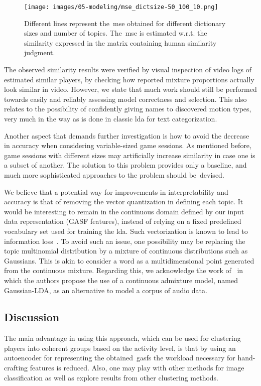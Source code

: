 \begin{figure}[h]
	\centering
	\texttt{[image: images/05-modeling/mse\_dictsize-50\_100\_10.png]}
	\caption{Different lines represent the~\gls{mse} obtained for different dictionary sizes and number of topics. The~\gls{mse} is estimated w.r.t. the similarity expressed in the matrix containing human similarity judgment.}
  \label{hyperparameter_results}
\end{figure}

The observed similarity results were verified by visual inspection of video logs of estimated similar players, by checking how reported mixture proportions actually look similar in video. However, we state that much work should still be performed towards easily and reliably assessing model correctness and selection. This also relates to the possibility of confidently giving names to discovered motion types, very much in the way as is done in classic \gls{lda} for text categorization.

Another aspect that demands further investigation is how to avoid the decrease in accuracy when considering variable-sized game sessions. As mentioned before, game sessions with different sizes may artificially increase similarity in case one is a subset of another. The solution to this problem provides only a baseline, and much more sophisticated approaches to the problem should be~devised.

We believe that a potential way for improvements in interpretability and accuracy is that of removing the vector quantization in defining each topic. It would be interesting to remain in the continuous domain defined by our input data representation (GASF features), instead of relying on a fixed predefined vocabulary set used for training the \gls{lda}. Such vectorization is known to lead to information loss~\cite{hu_latent_2012}. To avoid such an issue, one possibility may be replacing the topic multinomial distribution by a mixture of continuous distributions such as Gaussians. This is akin to consider a word as a multidimensional point generated from the continuous mixture. Regarding this, we acknowledge the work of~\cite{hu_latent_2012} in which the authors propose the use of a continuous admixture model, named Gaussian-LDA, as an alternative to model a corpus of audio data. 

\subsection{Discussion}
The main advantage in using this approach, which can be used for clustering players into coherent groups based on the activity level, is that by using an autoencoder for representing the obtained~\gls{gasf}s the workload necessary for hand-crafting features is reduced. Also, one may play with other methods for image classification  as well as explore results from other clustering methods.

